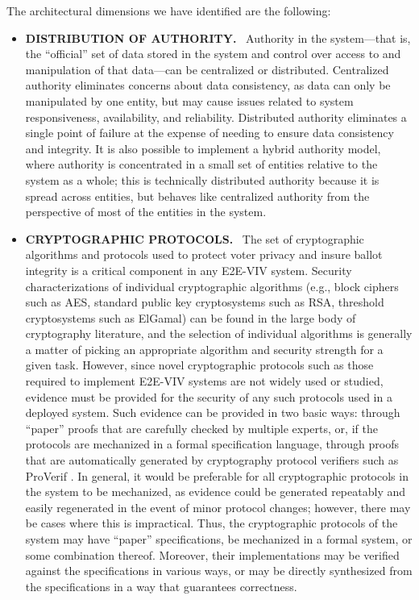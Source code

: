 The architectural dimensions we have identified are the following:

\begin{itemize}
\item \textbf{DISTRIBUTION OF AUTHORITY.} \ Authority in the
  system---that is, the ``official'' set of data stored in the system
  and control over access to and manipulation of that data---can be
  centralized or distributed. Centralized authority eliminates
  concerns about data consistency, as data can only be manipulated by
  one entity, but may cause issues related to system responsiveness,
  availability, and reliability. Distributed authority eliminates a
  single point of failure at the expense of needing to ensure data
  consistency and integrity. It is also possible to implement a hybrid
  authority model, where authority is concentrated in a small set of
  entities relative to the system as a whole; this is technically
  distributed authority because it is spread across entities, but
  behaves like centralized authority from the perspective of most of
  the entities in the system.

\item \textbf{CRYPTOGRAPHIC PROTOCOLS.} \ The set of cryptographic
  algorithms and protocols used to protect voter privacy and insure
  ballot integrity is a critical component in any E2E-VIV
  system. Security characterizations of individual cryptographic
  algorithms (e.g., block ciphers such as AES, standard public key
  cryptosystems such as RSA, threshold cryptosystems such as ElGamal)
  can be found in the large body of cryptography literature, and the
  selection of individual algorithms is generally a matter of picking
  an appropriate algorithm and security strength for a given
  task. However, since novel cryptographic protocols such as those
  required to implement E2E-VIV systems are not widely used or studied,
  evidence must be provided for the security of any such protocols
  used in a deployed system. Such evidence can be provided in two
  basic ways: through ``paper'' proofs that are carefully checked by
  multiple experts, or, if the protocols are mechanized in a formal
  specification language, through proofs that are automatically
  generated by cryptography protocol verifiers such as ProVerif
  \cite{ProVerif}. In general, it would be preferable for all
  cryptographic protocols in the system to be mechanized, as evidence
  could be generated repeatably and easily regenerated in the event of
  minor protocol changes; however, there may be cases where this is
  impractical. Thus, the cryptographic protocols of the system may
  have ``paper'' specifications, be mechanized in a formal system, or
  some combination thereof. Moreover, their implementations may be
  verified against the specifications in various ways, or may be
  directly synthesized from the specifications in a way that
  guarantees correctness.


\end{itemize}
